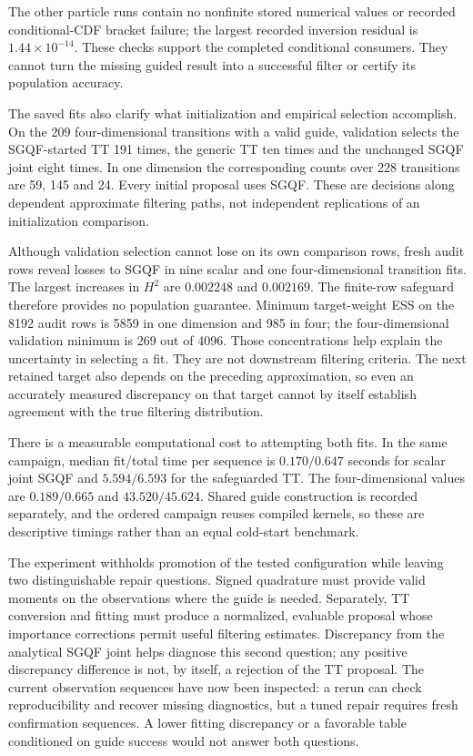 \documentclass[11pt]{article}
\begin{document}
The other particle runs contain no nonfinite stored numerical values or
recorded conditional-CDF bracket failure; the largest recorded inversion
residual is $1.44\times10^{-14}$. These checks support the completed
conditional consumers. They cannot turn the missing guided result into a
successful filter or certify its population accuracy.

The saved fits also clarify what initialization and empirical selection
accomplish. On the 209 four-dimensional transitions with a valid guide,
validation selects the SGQF-started TT 191 times, the generic TT ten times
and the unchanged SGQF joint eight times. In one dimension the corresponding
counts over 228 transitions are 59, 145 and 24. Every initial proposal uses
SGQF. These are decisions along dependent approximate filtering paths, not
independent replications of an initialization comparison.

Although validation selection cannot lose on its own comparison rows,
fresh audit rows reveal losses to SGQF in nine scalar and one
four-dimensional transition fits. The largest increases in $H^2$ are
$0.002248$ and $0.002169$. The finite-row safeguard therefore provides no
population guarantee. Minimum target-weight ESS on the 8192 audit rows is
5859 in one dimension and 985 in four; the four-dimensional validation
minimum is 269 out of 4096. Those concentrations help explain the
uncertainty in selecting a fit. They are not downstream filtering criteria.
The next retained target also depends on the preceding approximation, so
even an accurately measured discrepancy on that target cannot by itself
establish agreement with the true filtering distribution.

There is a measurable computational cost to attempting both fits. In the
same campaign, median fit/total time per sequence is $0.170/0.647$ seconds
for scalar joint SGQF and $5.594/6.593$ for the safeguarded TT. The
four-dimensional values are $0.189/0.665$ and $43.520/45.624$. Shared guide
construction is recorded separately, and the ordered campaign reuses
compiled kernels, so these are descriptive timings rather than an equal
cold-start benchmark.

The experiment withholds promotion of the tested configuration while leaving
two distinguishable repair questions. Signed quadrature must provide valid
moments on the observations where the guide is needed. Separately, TT
conversion and fitting must produce a normalized, evaluable proposal whose
importance corrections permit useful filtering estimates. Discrepancy from
the analytical SGQF joint helps diagnose this second question; any positive
discrepancy difference is not, by itself, a rejection of the TT proposal.
The current observation sequences have now been inspected: a rerun can check
reproducibility and recover missing diagnostics, but a tuned repair requires
fresh confirmation sequences. A lower fitting discrepancy or a favorable
table conditioned on guide success would not answer both questions.
\end{document}
